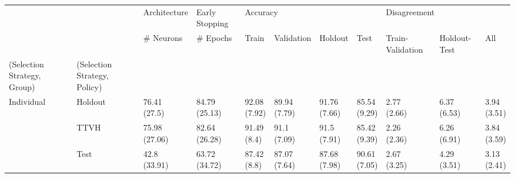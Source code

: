 \begin{table}
\centering
\label{tab:similar_sets_performance}
\begin{tabular}{lllllllllll}
\toprule
       &       &   Architecture & Early Stopping & \multicolumn{4}{l}{Accuracy} & \multicolumn{3}{l}{Disagreement} \\
       &       &      \# Neurons &       \# Epochs &          Train &    Validation &       Holdout &          Test & Train-Validation & Holdout-Test &          All \\
(Selection Strategy, Group) & (Selection Strategy, Policy) &                &                &                &               &               &               &                  &              &              \\
\midrule
Individual & Holdout &   \makecell{76.41\\(27.5)} &  \makecell{84.79\\(25.13)} &   \makecell{92.08\\(7.92)} &  \makecell{89.94\\(7.79)} &  \makecell{91.76\\(7.66)} &  \makecell{85.54\\(9.29)} &      \makecell{2.77\\(2.66)} &  \makecell{6.37\\(6.53)} &  \makecell{3.94\\(3.51)} \\
       & TTVH &  \makecell{75.98\\(27.06)} &  \makecell{82.64\\(26.28)} &    \makecell{91.49\\(8.4)} &   \makecell{91.1\\(7.09)} &   \makecell{91.5\\(7.91)} &  \makecell{85.42\\(9.39)} &      \makecell{2.26\\(2.36)} &  \makecell{6.26\\(6.91)} &  \makecell{3.84\\(3.59)} \\
       & Test &   \makecell{42.8\\(33.91)} &  \makecell{63.72\\(34.72)} &    \makecell{87.42\\(8.8)} &  \makecell{87.07\\(7.64)} &  \makecell{87.68\\(7.98)} &  \makecell{90.61\\(7.05)} &      \makecell{2.67\\(3.25)} &  \makecell{4.29\\(3.51)} &  \makecell{3.13\\(2.41)} \\

\end{tabular}
\end{table}
